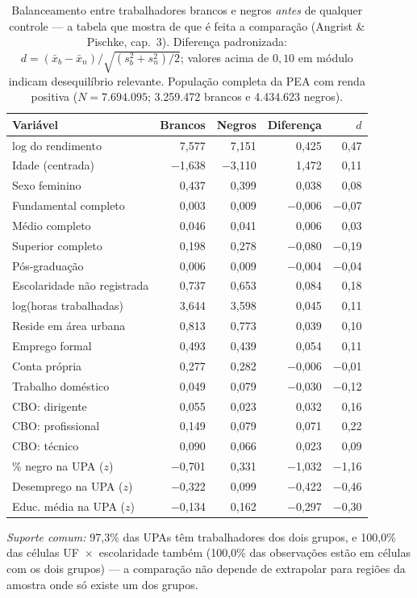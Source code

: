 \begin{table}[!ht]
\centering
\caption{Balanceamento entre trabalhadores brancos e negros \emph{antes} de qualquer
controle --- a tabela que mostra de que é feita a comparação (Angrist \& Pischke, cap.~3).
Diferença padronizada: $d = (\bar x_b - \bar x_n)/\sqrt{(s_b^2+s_n^2)/2}$; valores acima de
$0{,}10$ em módulo indicam desequilíbrio relevante. População completa da PEA com renda
positiva ($N = 7.694.095$; 3.259.472 brancos e 4.434.623 negros).}
\label{tab:balanceamento}
\small
\begin{tabular}{lrrrr}
\toprule
Variável & Brancos & Negros & Diferença & $d$ \\
\midrule
log do rendimento & 7,577 & 7,151 & 0,425 & 0,47 \\
Idade (centrada) & −1,638 & −3,110 & 1,472 & 0,11 \\
Sexo feminino & 0,437 & 0,399 & 0,038 & 0,08 \\
Fundamental completo & 0,003 & 0,009 & −0,006 & −0,07 \\
Médio completo & 0,046 & 0,041 & 0,006 & 0,03 \\
Superior completo & 0,198 & 0,278 & −0,080 & −0,19 \\
Pós-graduação & 0,006 & 0,009 & −0,004 & −0,04 \\
Escolaridade não registrada & 0,737 & 0,653 & 0,084 & 0,18 \\
log(horas trabalhadas) & 3,644 & 3,598 & 0,045 & 0,11 \\
Reside em área urbana & 0,813 & 0,773 & 0,039 & 0,10 \\
Emprego formal & 0,493 & 0,439 & 0,054 & 0,11 \\
Conta própria & 0,277 & 0,282 & −0,006 & −0,01 \\
Trabalho doméstico & 0,049 & 0,079 & −0,030 & −0,12 \\
CBO: dirigente & 0,055 & 0,023 & 0,032 & 0,16 \\
CBO: profissional & 0,149 & 0,079 & 0,071 & 0,22 \\
CBO: técnico & 0,090 & 0,066 & 0,023 & 0,09 \\
\% negro na UPA ($z$) & −0,701 & 0,331 & −1,032 & −1,16 \\
Desemprego na UPA ($z$) & −0,322 & 0,099 & −0,422 & −0,46 \\
Educ. média na UPA ($z$) & −0,134 & 0,162 & −0,297 & −0,30 \\
\bottomrule
\end{tabular}
\normalsize
\par\smallskip
\footnotesize\emph{Suporte comum:} 97,3\% das UPAs têm
trabalhadores dos dois grupos, e 100,0\% das células
UF~$\times$~escolaridade também (100,0\% das observações
estão em células com os dois grupos) --- a comparação não depende de extrapolar para
regiões da amostra onde só existe um dos grupos.
\end{table}
